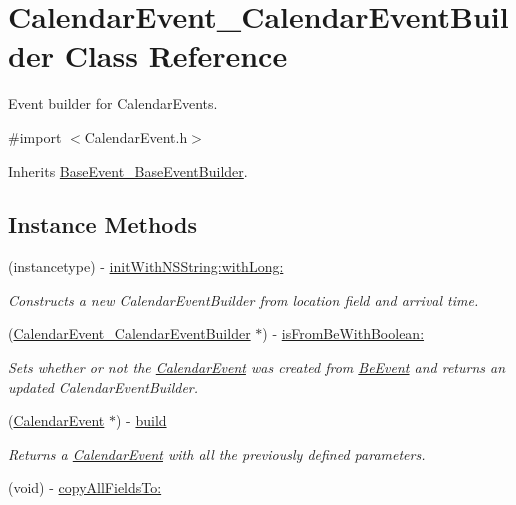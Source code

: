 \hypertarget{interface_calendar_event___calendar_event_builder}{}\section{Calendar\+Event\+\_\+\+Calendar\+Event\+Builder Class Reference}
\label{interface_calendar_event___calendar_event_builder}


Event builder for Calendar\+Events.  




{\ttfamily \#import $<$Calendar\+Event.\+h$>$}



Inherits \hyperlink{interface_base_event___base_event_builder}{Base\+Event\+\_\+\+Base\+Event\+Builder}.

\subsection*{Instance Methods}
\begin{DoxyCompactItemize}
\item 
(instancetype) -\/ \hyperlink{interface_calendar_event___calendar_event_builder_acb5d1e85decc979de60ef369ae515398}{init\+With\+N\+S\+String\+:with\+Long\+:}
\begin{DoxyCompactList}\small\item\em Constructs a new Calendar\+Event\+Builder from location field and arrival time. \end{DoxyCompactList}\item 
(\hyperlink{interface_calendar_event___calendar_event_builder}{Calendar\+Event\+\_\+\+Calendar\+Event\+Builder} $\ast$) -\/ \hyperlink{interface_calendar_event___calendar_event_builder_a8a73c597ee2dcb0eba77d0e935244196}{is\+From\+Be\+With\+Boolean\+:}
\begin{DoxyCompactList}\small\item\em Sets whether or not the \hyperlink{interface_calendar_event}{Calendar\+Event} was created from \hyperlink{interface_be_event}{Be\+Event} and returns an updated Calendar\+Event\+Builder. \end{DoxyCompactList}\item 
(\hyperlink{interface_calendar_event}{Calendar\+Event} $\ast$) -\/ \hyperlink{interface_calendar_event___calendar_event_builder_a97b773ce341839e80511e0dac001164a}{build}
\begin{DoxyCompactList}\small\item\em Returns a \hyperlink{interface_calendar_event}{Calendar\+Event} with all the previously defined parameters. \end{DoxyCompactList}\item 
(void) -\/ \hyperlink{interface_calendar_event___calendar_event_builder_a87ca0f31acb3c7aadbd5d1508423aec6}{copy\+All\+Fields\+To\+:}
\end{DoxyCompactItemize}
